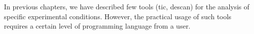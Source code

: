 %
%
%
%
%

In previous chapters, we have described few tools (\gls{tic}, \gls{descan}) for the analysis of specific experimental conditions. 
However, the practical usage of such tools requires a certain level of programming language from a user.

